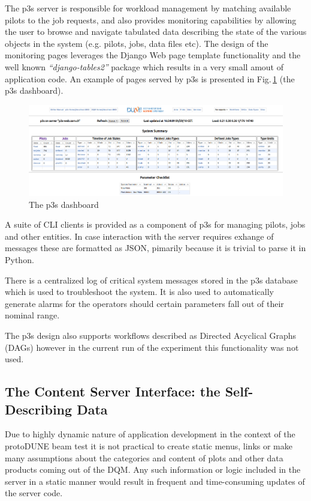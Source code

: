 \documentclass{webofc}
\newcommand{\pd}{protoDUNE\xspace}
\begin{document}
The p3s server is responsible for workload management by matching available pilots to the job requests,
and also provides monitoring capabilities by allowing the user to browse and navigate
tabulated data describing the state of the various objects in the system (e.g. pilots, jobs, data files etc).
The design of the monitoring pages leverages the Django Web page template functionality and
the well known \textit{``django-tables2''} package which results
in a very small amout of application code. An example of pages served by p3s is
presented in Fig.\,\ref{fig:p3s_dash} (the p3s dashboard).

\begin{figure}[tb]
\centering\includegraphics[width=1.0\textwidth]{figures/p3s_dash_2018_v1.png}
\caption{\label{fig:p3s_dash}The p3s dashboard}
\end{figure}

 A suite of CLI clients is provided as a component of p3s for managing pilots, jobs and
other entities. In case interaction with the server requires exhange of messages these are
formatted as JSON, pimarily because it is trivial to parse it in Python.

There is a centralized log of critical system messages stored in the p3s database which
is used to troubleshoot the system. It is also used to automatically generate alarms
for the operators should certain parameters fall out of their nominal range.

The p3s design also supports workflows described as Directed Acyclical Graphs (DAGs)
however in the current run of the experiment this functionality was not used.

\subsection{The Content Server Interface: the Self-Describing Data}
Due to highly dynamic nature of application development in the context of the \pd beam
test it is not practical to create static menus, links or make many assumptions about
the categories and content of plots and other data products coming out of the DQM.
Any such information or logic included in the server in a static manner would result
in frequent and time-consuming updates of the server code.
\end{document}
